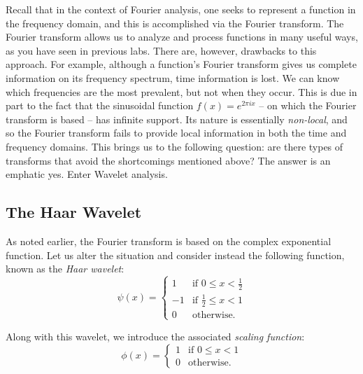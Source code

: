 

Recall that in the context of Fourier analysis, one seeks to represent a
function in the frequency domain, and this is accomplished via the Fourier
transform. The Fourier transform allows us to analyze and process functions
in many useful ways, as you have seen in previous labs. There are, however,
drawbacks to this approach. For example, although a function's Fourier
transform gives us complete information on its frequency spectrum, time
information is lost. We can know which frequencies are the
most prevalent, but not when they occur. This is due in part to the fact that
the sinusoidal function $f(x) = e^{2\pi ix}$ -- on which the Fourier transform
is based -- has infinite support. Its nature is essentially \emph{non-local},
and so the Fourier transform fails to provide local information in both the
time and frequency domains. This brings us to the following question: are
there types of transforms that avoid the shortcomings mentioned above? The
answer is an emphatic yes. Enter Wavelet analysis.

\subsection*{The Haar Wavelet}

As noted earlier, the Fourier transform is based on the complex exponential
function. Let us alter the situation and consider instead the following
function, known as the \emph{Haar wavelet}:
\begin{equation*}
\psi(x) =
 \begin{cases}
  1 & \text{if } 0 \leq x < \frac{1}{2} \\
  -1 & \text{if } \frac{1}{2} \leq x < 1 \\
  0 & \text{otherwise.}
 \end{cases}
\end{equation*}


Along with this wavelet, we introduce the associated \emph{scaling function}:
\begin{equation*}
\phi(x) =
 \begin{cases}
 1 & \text{if } 0 \leq x < 1 \\
 0 & \text{otherwise.}
 \end{cases}
\end{equation*}

